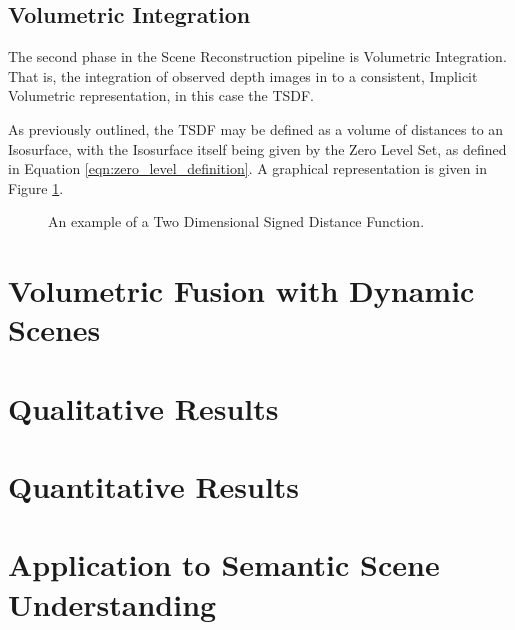\subsection{Volumetric Integration}
The second phase in the Scene Reconstruction pipeline is Volumetric Integration.
That is, the integration of observed depth images in to a consistent, Implicit
Volumetric representation, in this case the TSDF.

As previously outlined, the TSDF may be defined as a volume of distances to an
Isosurface, with the Isosurface itself being given by the Zero Level Set, as
defined in Equation \ref{eqn:zero_level_definition}. A graphical representation
is given in Figure \ref{fig:sdf_example}.
\begin{figure}
  \label{fig:sdf_example}
  \centering
  \caption{An example of a Two Dimensional Signed Distance Function.}
\end{figure}

\section{Volumetric Fusion with Dynamic Scenes}
\label{sec:moseg_dynamic_fusion}

\section{Qualitative Results}
\label{sec:moseg_qualitative}

\section{Quantitative Results}
\label{sec:moseg_quantitative}

\section{Application to Semantic Scene Understanding}
\label{sec:moseg_semantic}